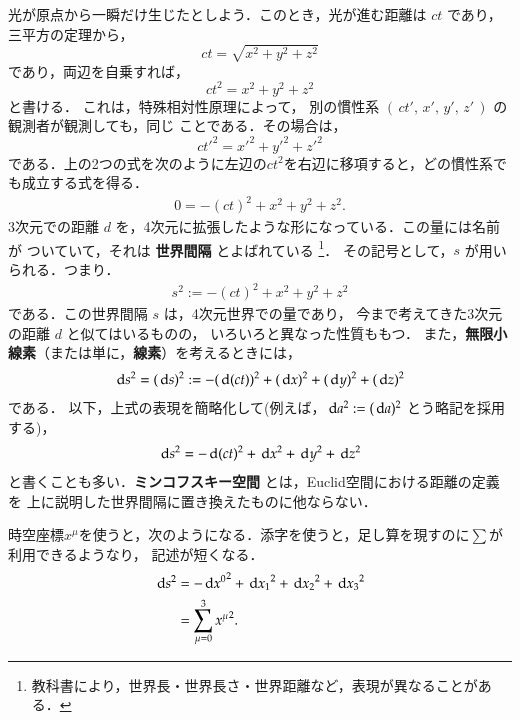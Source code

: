     光が原点から一瞬だけ生じたとしよう．このとき，光が進む距離は $ct$ であり，
    三平方の定理から，
        \begin{equation*}
            ct = \sqrt{{x}^{2} + {y}^{2} + {z}^{2}}
        \end{equation*}
    であり，両辺を自乗すれば，
        \begin{equation*}
            ct^{2} = {x}^{2} + {y}^{2} + {z}^{2}
        \end{equation*}
    と書ける．
    これは，特殊相対性原理によって，
    別の慣性系 $(\,ct',\,x',\,y',\,z'\,)$ の観測者が観測しても，同じ
    ことである．その場合は，
        \begin{equation*}
            {ct'}^{2} = {x'}^{2} + {y'}^{2} + {z'}^{2}
        \end{equation*}
    である．上の2つの式を次のように左辺の${ct}^{2}$を右辺に移項すると，どの慣性系でも成立する式を得る．
        \begin{align}
            0 = -(ct)^{2} + {x}^{2} + {y}^{2} + {z}^{2}.
        \end{align}
    3次元での距離 $d$ を，4次元に拡張したような形になっている．この量には名前が
    ついていて，それは \textbf{世界間隔} とよばれている
        \footnote{
            教科書により，世界長・世界長さ・世界距離など，表現が異なることがある．
        }．
    その記号として，$s$ が用いられる．つまり．
        \begin{align}
            s^{2} := -(ct)^{2} + {x}^{2} + {y}^{2} + {z}^{2}
        \end{align}
    である．この世界間隔 $s$ は，4次元世界での量であり，
    今まで考えてきた3次元の距離 $d$ と似てはいるものの，
    いろいろと異なった性質ももつ．
    また，\textbf{無限小線素}（または単に，\textbf{線素}）を考えるときには，
        \begin{align}
            \,\mathrm{d} s^{2} = (\,\mathrm{d} s)^{2} := -(\,\mathrm{d} (ct))^{2} + (\,\mathrm{d} x)^{2} + (\,\mathrm{d} y)^{2} + (\,\mathrm{d} z)^{2}
        \end{align}
    である．
    以下，上式の表現を簡略化して(例えば，$\,\mathrm{d} a^{2}:= (\,\mathrm{d} a)^{2}$ とう略記を採用する)，
    \begin{align}
        \,\mathrm{d} s^{2} = -\,\mathrm{d} (ct)^{2} + \,\mathrm{d} x^{2} + \,\mathrm{d} y^{2} + \,\mathrm{d} z^{2}
    \end{align}
    と書くことも多い．\textbf{ミンコフスキー空間} とは，Euclid空間における距離の定義を
    上に説明した世界間隔に置き換えたものに他ならない．

    時空座標$x^{\mu}$を使うと，次のようになる．添字を使うと，足し算を現すのに$\sum$が利用できるようなり，
    記述が短くなる．
    \begin{align}
        \,\mathrm{d} s^{2} &= -{\,\mathrm{d} {x}^{0}}^{2} + {\,\mathrm{d} x_{1}}^{2} + {\,\mathrm{d} x_{2}}^{2} + {\,\mathrm{d} x_{3}}^{2} \notag \\
                  &= \sum_{\mu=0}^{3} {{x}^{\mu}}^{2}.
    \end{align}

